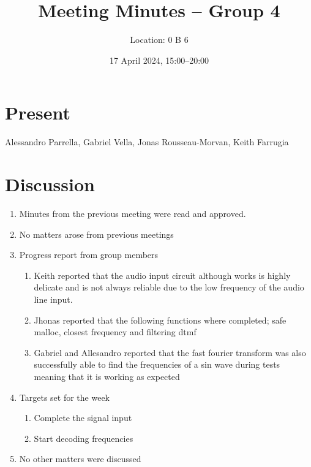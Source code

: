 \documentclass{cce2014-meetings}
\title{Meeting Minutes -- Group 4}
\author{Location: 0 B 6}
\date{17 April 2024, 15:00--20:00}
\begin{document}
\maketitle

\section*{Present}
Alessandro Parrella,
Gabriel Vella,
Jonas Rousseau-Morvan,
Keith Farrugia

\section*{Discussion}

\begin{enumerate}


      \item Minutes from the previous meeting were read and approved.

      \item No matters arose from previous meetings

      \item Progress report from group members
            \begin{enumerate}
                  \item Keith reported that the audio input circuit although works is highly delicate and is not always
                  reliable due to the low frequency of the audio line input.
                  \item Jhonas reported that the following functions where completed; safe malloc, closest frequency and filtering dtmf
                  \item Gabriel and Allesandro reported that the fast fourier transform was also successfully able to 
                  find the frequencies of a sin wave during tests meaning that it is working as expected
            \end{enumerate}

      \item Targets set for the week
            \begin{enumerate}
                  \item Complete the signal input
                  \item Start decoding frequencies
            \end{enumerate}
            
      \item No other matters were discussed
\end{enumerate}
\end{document}
